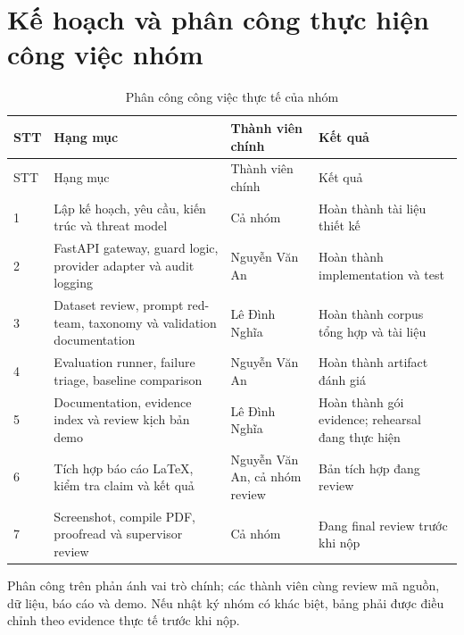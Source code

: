 \chapter*{Kế hoạch và phân công thực hiện công việc nhóm}

\begin{longtable}{p{0.7cm}p{6.4cm}p{3.2cm}p{3.2cm}}
\caption{Phân công công việc thực tế của nhóm}\label{tab:group-work-final}\\
\toprule
STT & Hạng mục & Thành viên chính & Kết quả \\
\midrule
\endfirsthead
\toprule
STT & Hạng mục & Thành viên chính & Kết quả \\
\midrule
\endhead
1 & Lập kế hoạch, yêu cầu, kiến trúc và threat model & Cả nhóm & Hoàn thành tài liệu thiết kế \\
2 & FastAPI gateway, guard logic, provider adapter và audit logging & Nguyễn Văn An & Hoàn thành implementation và test \\
3 & Dataset review, prompt red-team, taxonomy và validation documentation & Lê Đình Nghĩa & Hoàn thành corpus tổng hợp và tài liệu \\
4 & Evaluation runner, failure triage, baseline comparison & Nguyễn Văn An & Hoàn thành artifact đánh giá \\
5 & Documentation, evidence index và review kịch bản demo & Lê Đình Nghĩa & Hoàn thành gói evidence; rehearsal đang thực hiện \\
6 & Tích hợp báo cáo LaTeX, kiểm tra claim và kết quả & Nguyễn Văn An, cả nhóm review & Bản tích hợp đang review \\
7 & Screenshot, compile PDF, proofread và supervisor review & Cả nhóm & Đang final review trước khi nộp \\
\bottomrule
\end{longtable}

Phân công trên phản ánh vai trò chính; các thành viên cùng review mã nguồn, dữ
liệu, báo cáo và demo. Nếu nhật ký nhóm có khác biệt, bảng phải được điều chỉnh
theo evidence thực tế trước khi nộp.
